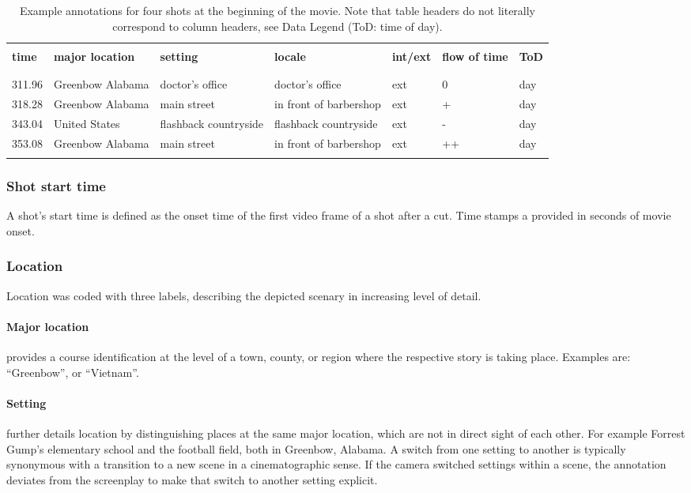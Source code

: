 \documentclass[10pt,a4paper,twocolumn]{article}
\begin{document}
\begin{table*}
\caption{Example annotations for four shots at the beginning of the movie. Note
that table headers do not literally correspond to column headers, see Data Legend
(ToD: time of day).}
\label{tab:example}
\begin{tabular}{lllllll}
\hline\\ 
\textbf{time} & \textbf{major location} & \textbf{setting} & \textbf{locale} & \textbf{int/ext} & \textbf{flow of time} & \textbf{ToD}\\
\\\hline\\ 
311.96  & Greenbow Alabama  & doctor's office  & doctor's office  & ext  & 0 & day\tabularnewline
318.28  & Greenbow Alabama  & main street  & in front of barbershop  & ext  & + & day\tabularnewline
343.04  & United States  & flashback countryside  & flashback countryside  & ext  & - & day\tabularnewline
353.08 & Greenbow Alabama  & main street  & in front of barbershop  & ext  & ++ & day\tabularnewline
\\\hline 
\end{tabular}
\end{table*}



\subsubsection*{Shot start time}

A shot's start time is defined as the onset time of the first video frame of a
shot after a cut. Time stamps a provided in seconds of movie onset. 

\subsubsection*{Location}

Location was coded with three labels, describing the depicted scenary
in increasing level of detail.

\paragraph{Major location} provides a course identification at the level of a
town, county, or region where the respective story is taking place. Examples are:
``Greenbow'', or ``Vietnam''.

\paragraph{Setting} further details location by distinguishing places at the same
major location, which are not in direct sight of each other. For example
Forrest Gump's elementary school and the football field, both in Greenbow,
Alabama. A switch from one setting to another is typically synonymous with a
transition to a new scene in a cinematographic sense. If the camera switched 
settings within a scene, the annotation deviates from the screenplay to make that
switch to another setting explicit.
\end{document}

